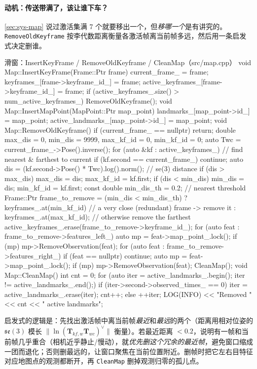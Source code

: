 \paragraph{动机：传送带满了，该让谁下车？}
\cref{sec:sys-map} 说过激活集满 7 个就要移出一个，但\emph{移哪一个}是有讲究的。\texttt{RemoveOldKeyframe} 按李代数距离衡量各激活帧离当前帧多远，然后用一条启发式决定删谁。

\begin{codebox}[C++]{滑窗：InsertKeyFrame / RemoveOldKeyframe / CleanMap（src/map.cpp）}
void Map::InsertKeyFrame(Frame::Ptr frame) {
    current_frame_ = frame;
    keyframes_[frame->keyframe_id_] = frame;
    active_keyframes_[frame->keyframe_id_] = frame;
    if (active_keyframes_.size() > num_active_keyframes_) RemoveOldKeyframe();
}
void Map::InsertMapPoint(MapPoint::Ptr map_point) {
    landmarks_[map_point->id_] = map_point;
    active_landmarks_[map_point->id_] = map_point;
}
void Map::RemoveOldKeyframe() {
    if (current_frame_ == nullptr) return;
    double max_dis = 0, min_dis = 9999, max_kf_id = 0, min_kf_id = 0;
    auto Twc = current_frame_->Pose().inverse();
    for (auto &kf : active_keyframes_) {            // find nearest & farthest to current
        if (kf.second == current_frame_) continue;
        auto dis = (kf.second->Pose() * Twc).log().norm();  // se(3) distance
        if (dis > max_dis) { max_dis = dis; max_kf_id = kf.first; }
        if (dis < min_dis) { min_dis = dis; min_kf_id = kf.first; }
    }
    const double min_dis_th = 0.2;                  // nearest threshold
    Frame::Ptr frame_to_remove = (min_dis < min_dis_th)
        ? keyframes_.at(min_kf_id)   // a very close (redundant) frame -> remove it
        : keyframes_.at(max_kf_id);  // otherwise remove the farthest
    active_keyframes_.erase(frame_to_remove->keyframe_id_);
    for (auto feat : frame_to_remove->features_left_) {
        auto mp = feat->map_point_.lock();  if (mp) mp->RemoveObservation(feat);
    }
    for (auto feat : frame_to_remove->features_right_) {
        if (feat == nullptr) continue;
        auto mp = feat->map_point_.lock();  if (mp) mp->RemoveObservation(feat);
    }
    CleanMap();
}
void Map::CleanMap() {
    int cnt = 0;
    for (auto iter = active_landmarks_.begin(); iter != active_landmarks_.end();) {
        if (iter->second->observed_times_ == 0) { iter = active_landmarks_.erase(iter); cnt++; }
        else ++iter;
    }
    LOG(INFO) << "Removed " << cnt << " active landmarks";
}
\end{codebox}

\noindent 启发式的逻辑是：先找出激活帧中离当前帧\emph{最近}和\emph{最远}的两个（距离用相对位姿的 $\mathfrak{se}(3)$ 模长 $\|\ln(\mathbf{T}_{kf,w}\mathbf{T}_{wc})^\vee\|$ 衡量）。若最近距离 $<0.2$，说明有一帧和当前帧几乎重合（相机近乎静止/慢动），就\emph{优先删这个冗余的最近帧}，避免窗口缩成一团而退化；否则删最远的，让窗口聚焦在当前位置附近。删帧时把它左右目特征对应地图点的观测都断开，再 \texttt{CleanMap} 删掉观测归零的孤儿点。


